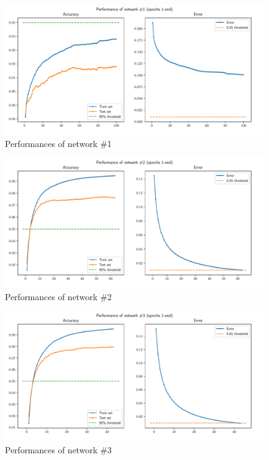 \documentclass[letterpaper,headings=standardclasses]{scrartcl}
\begin{document}
\begin{figure}[H]
    \centering
    \includegraphics[width=\linewidth]{net1.pdf}
    \caption{Performances of network \#1}
    \label{net1}
\end{figure}

\begin{figure}[H]
    \centering
    \includegraphics[width=\linewidth]{net2.pdf}
    \caption{Performances of network \#2}
    \label{net2}
\end{figure}

\begin{figure}[H]
    \centering
    \includegraphics[width=\linewidth]{net3.pdf}
    \caption{Performances of network \#3}
    \label{net3}
\end{figure}
\end{document}
